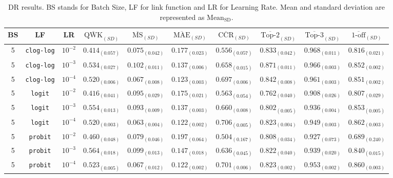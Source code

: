 \documentclass[journal]{IEEEtran}
\begin{document}
	\begin{table}[!t]
		\caption{DR results. BS stands for Batch Size, LF for link function and LR for Learning Rate. Mean and standard deviation are represented as $\text{Mean}_\text{SD}$.}
		\label{table:DRresults}
		\footnotesize
		\centering
		\begin{tabular}{c@{\hskip 0.15cm}c@{\hskip 0.15cm}c@{\hskip 0.15cm}c@{\hskip 0.30cm}c@{\hskip 0.20cm}c@{\hskip 0.20cm}c@{\hskip 0.20cm}c@{\hskip 0.20cm}c@{\hskip 0.20cm}c}
			\hline
			\hline
			BS & LF & LR & $\overline{\text{QWK}}_{{(SD)}}$ & $\overline{\text{MS}}_{{(SD)}}$ & $\overline{\text{MAE}}_{{(SD)}}$ & $\overline{\text{CCR}}_{{(SD)}}$ & $\overline{\text{Top-2}}_{{(SD)}}$ & $\overline{\text{Top-3}}_{{(SD)}}$ & $\overline{\text{1-off}}_{{(SD)}}$\\\hline
			5 & \texttt{clog-log} & $10^{-2}$ & $0.414_{(0.057)}$ & $0.075_{(0.042)}$ & $0.177_{(0.023)}$ & $0.556_{(0.057)}$ & $0.833_{(0.042)}$ & $0.968_{(0.011)}$ & $0.816_{(0.021)}$\\
			5 & \texttt{clog-log} & $10^{-3}$ & $0.534_{(0.027)}$ & $0.102_{(0.011)}$ & $0.137_{(0.006)}$ & $0.658_{(0.015)}$ & $0.871_{(0.011)}$ & $0.966_{(0.003)}$ & $0.852_{(0.002)}$\\
			5 & \texttt{clog-log} & $10^{-4}$ & $0.520_{(0.006)}$ & $0.067_{(0.008)}$ & $0.123_{(0.003)}$ & $0.697_{(0.006)}$ & $0.842_{(0.008)}$ & $0.961_{(0.003)}$ & $0.851_{(0.002)}$\\
			5 & \texttt{logit} & $10^{-2}$ & $0.416_{(0.041)}$ & $0.095_{(0.029)}$ & $0.175_{(0.021)}$ & $0.563_{(0.054)}$ & $0.762_{(0.040)}$ & $0.908_{(0.026)}$ & $0.807_{(0.029)}$\\
			5 & \texttt{logit} & $10^{-3}$ & $0.554_{(0.013)}$ & $0.093_{(0.009)}$ & $0.137_{(0.003)}$ & $0.660_{(0.008)}$ & $0.802_{(0.005)}$ & $0.936_{(0.004)}$ & $0.853_{(0.005)}$\\
			5 & \texttt{logit} & $10^{-4}$ & $0.520_{(0.003)}$ & $0.063_{(0.004)}$ & $0.122_{(0.002)}$ & $0.706_{(0.005)}$ & $0.823_{(0.004)}$ & $0.949_{(0.003)}$ & $0.862_{(0.003)}$\\
			5 & \texttt{probit} & $10^{-2}$ & $0.460_{(0.048)}$ & $0.079_{(0.046)}$ & $0.197_{(0.064)}$ & $0.504_{(0.167)}$ & $0.808_{(0.034)}$ & $0.927_{(0.073)}$ & $0.689_{(0.240)}$\\
			5 & \texttt{probit} & $10^{-3}$ & $0.564_{(0.018)}$ & $0.099_{(0.013)}$ & $0.147_{(0.018)}$ & $0.636_{(0.045)}$ & $0.822_{(0.040)}$ & $0.939_{(0.020)}$ & $0.840_{(0.015)}$\\
			5 & \texttt{probit} & $10^{-4}$ & $0.523_{(0.005)}$ & $0.067_{(0.012)}$ & $0.122_{(0.002)}$ & $0.701_{(0.006)}$ & $0.823_{(0.002)}$ & $0.953_{(0.002)}$ & $0.860_{(0.003)}$\\

\end{tabular}
\end{table}
\end{document}
